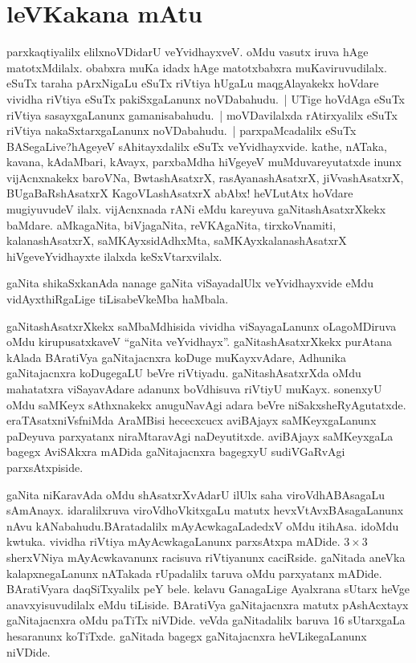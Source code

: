 \chapter*{leVKakana mAtu}


parxkaqtiyalilx elilxnoVDidarU veYvidhayxveV. oMdu vasutx iruva hAge matotxMdilalx. obabxra\- muKa idadx hAge matotxbabxra muKaviruvudilalx. eSuTx taraha pArxNigaLu eSuTx\- riVtiya hUgaLu maqgAlayakekx hoVdare vividha riVtiya eSuTx pakiSxgaLanunx noVDabahudu.~| UTige hoVdAga eSuTx riVtiya sasayxgaLanunx gamanisabahudu.~| moVDavilalxda rAtirx\-yalilx eSuTx riVtiya nakaSxtarxgaLanunx noVDabahudu.~| parxpaMcadalilx eSuTx BASegaLive?\break hAgeyeV sAhitayxdalilx eSuTx veYvidhayxvide. kathe, nATaka, kavana, kAdaMbari, kAvayx, parxbaMdha hiVgeyeV muMduvareyutatxde inunx vijAcnxnakekx baroVNa, BwtashAsatxrX, rasAyanashAsatxrX, jiVvashAsatxrX, BUgaBaRshAsatxrX KagoVLashAsatxrX abAbx! heVLutAtx hoVdare mugiyu\-vudeV ilalx. vijAcnxnada rANi eMdu kareyuva gaNitashAsatxrXkekx baMdare. aMkagaNita, biVjagaNita,\- reVKAgaNita, tirxkoVnamiti, kalanashAsatxrX, saMKAyxsidAdhxMta, saMKAyxkalanashAsatxrX hiVge\break veYvidhayxte ilalxda keSxVtarxvilalx.

gaNita shikaSxkanAda nanage gaNita viSayadalUlx veYvidhayxvide eMdu vidAyxthiRgaLige tiLisabeVkeMba haMbala.

gaNitashAsatxrXkekx saMbaMdhisida vividha viSayagaLanunx oLagoMDiruva oMdu kirupusatxkaveV ``gaNita veYvidhayx''. gaNitashAsatxrXkekx purAtana kAlada BAratiVya gaNitajacnxra koDuge muKayxvAdare, Adhunika gaNitajacnxra koDugegaLU beVre riVtiyadu. gaNitashAsatxrXda oMdu mahatatxra viSayavAdare adanunx boVdhisuva riVtiyU muKayx. sonenxyU oMdu saMKeyx sAthxnakekx anuguNavAgi adara beVre niSakxsheRyAgutatxde. eraTAsatxniVsfniMda AraMBisi hececxcucx aviBAjayx saMKeyxgaLanunx paDeyuva parxyatanx niraMtaravAgi naDeyutitxde. aviBAjayx saMKeyxgaLa bagegx AviSAkxra mADida gaNitajacnxra bagegxyU sudiVGaRvAgi parxsAtxpiside.

gaNita niKaravAda oMdu shAsatxrXvAdarU ilUlx saha viroVdhABAsagaLu sAmAnayx. idaralilxruva viroVdhoVkitxgaLu matutx hevxVtAvxBAsagaLanunx nAvu kANabahudu.\break BAratadalilx mAyAcwkagaLadedxV oMdu itihAsa. idoMdu kwtuka. vividha riVtiya mAyA\-cwkagaLanunx parxsAtxpa mADide. $3\times 3$ sherxVNiya mAyAcwkavanunx racisuva riVtiyanunx caciRside. gaNitada aneVka kalapxnegaLanunx nATakada rUpadalilx taruva oMdu parxya\-tanx mADide. BAratiVyara daqSiTxyalilx peY bele. kelavu GanagaLige Ayalxrana sUtarx heVge anavxyisuvudilalx eMdu tiLiside. BAratiVya gaNitajacnxra matutx pAshAcxtayx gaNitaja\-cnxra oMdu paTiTx niVDide. veVda gaNitadalilx baruva {\rm 16} sUtarxgaLa hesaranunx koTiTxde. gaNitada bagegx gaNitajacnxra heVLikegaLanunx niVDide.

